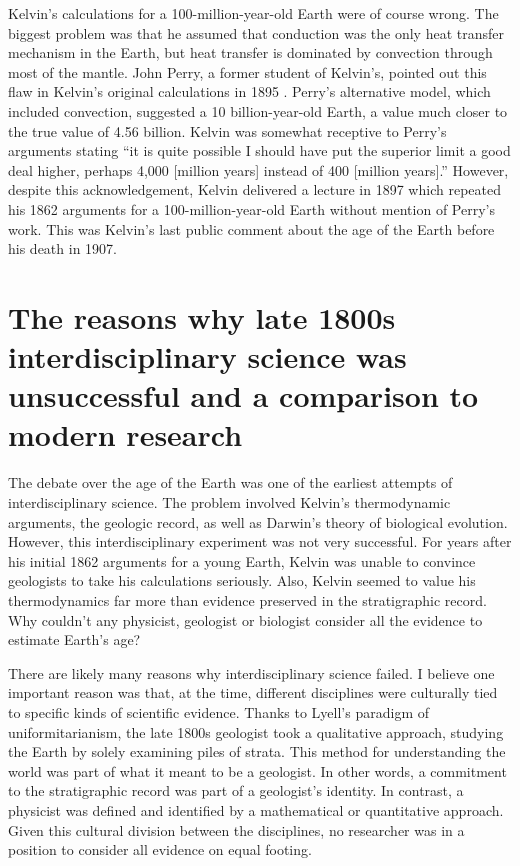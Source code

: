 \documentclass[12pt]{article}
\begin{document}
Kelvin's calculations for a 100-million-year-old Earth were of course wrong. The biggest problem was that he assumed that conduction was the only heat transfer mechanism in the Earth, but heat transfer is dominated by convection through most of the mantle. John Perry, a former student of Kelvin's, pointed out this flaw in Kelvin's original calculations in 1895 \citep{England_2007}. Perry's alternative model, which included convection, suggested a 10 billion-year-old Earth, a value much closer to the true value of 4.56 billion. Kelvin was somewhat receptive to Perry's arguments stating ``it is quite possible I should have put the superior limit a good deal higher, perhaps 4,000 [million years] instead of 400 [million years].'' However, despite this acknowledgement, Kelvin delivered a lecture in 1897 which repeated his 1862 arguments for a 100-million-year-old Earth without mention of Perry's work. This was Kelvin's last public comment about the age of the Earth before his death in 1907.

\section{The reasons why late 1800s interdisciplinary science was unsuccessful and a comparison to modern research} \label{sec:3}

The debate over the age of the Earth was one of the earliest attempts of interdisciplinary science. The problem involved Kelvin's thermodynamic arguments, the geologic record, as well as Darwin's theory of biological evolution. However, this interdisciplinary experiment was not very successful. For years after his initial 1862 arguments for a young Earth, Kelvin was unable to convince geologists to take his calculations seriously. Also, Kelvin seemed to value his thermodynamics far more than evidence preserved in the stratigraphic record. Why couldn't any physicist, geologist or biologist consider all the evidence to estimate Earth's age?

There are likely many reasons why interdisciplinary science failed. I believe one important reason was that, at the time, different disciplines were culturally tied to specific kinds of scientific evidence. Thanks to Lyell's paradigm of uniformitarianism, the late 1800s geologist took a qualitative approach, studying the Earth by solely examining piles of strata. This method for understanding the world was part of what it meant to be a geologist. In other words, a commitment to the stratigraphic record was part of a geologist's identity. In contrast, a physicist was defined and identified by a mathematical or quantitative approach. Given this cultural division between the disciplines, no researcher was in a position to consider all evidence on equal footing.
\end{document}
